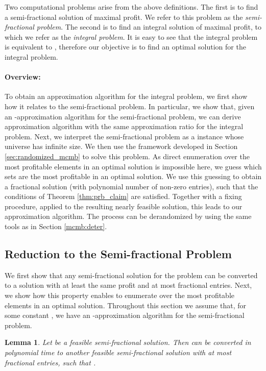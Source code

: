 \documentclass[11pt]{article}
\newtheorem{lemma}[theorem]{Lemma}
\begin{document}
{Two computational problems arise from the above definitions. The first
is to find a semi-fractional solution of maximal profit. We refer to this
problem as the {\em semi-fractional problem}. The second
is to find an integral solution of maximal profit, to which we refer as
the {\em integral problem}. It is easy to see that the integral problem is
equivalent to , therefore our objective is to find an optimal solution
for the integral problem.

\paragraph{Overview:} To obtain an approximation algorithm for the integral problem,
we first show how it relates to the semi-fractional problem. In particular, we show
that, given an -approximation algorithm for the
semi-fractional problem, we can derive approximation algorithm with
the same approximation ratio for the integral problem.
Next, we interpret the semi-fractional problem as a  instance
whose universe has infinite size.
We then use the framework developed in Section \ref{sec:randomized_mcmb}
to solve this problem. As direct enumeration over the most
profitable elements in an optimal solution is impossible here, we
guess which sets are the most profitable in an optimal solution.
We use this guessing to obtain a fractional solution (with
polynomial number of non-zero entries), such that the conditions of
Theorem \ref{thm:prb_claim} are satisfied. Together with a fixing procedure,
applied to the resulting nearly feasible solution, this leads to our
approximation algorithm. The process can be derandomized by using the
same tools as in Section \ref{mcmb:deter}.

\subsection{Reduction to the Semi-fractional Problem}

We first show that any semi-fractional solution for the problem can
be converted to a solution with at least the
same profit and at most  fractional
entries. Next, we show how this property
enables to enumerate over the most profitable elements in an optimal solution.
Throughout this section we assume that, for some constant
, we have
an -approximation algorithm for the semi-fractional problem.

\begin{lemma}
\label{lemma:frac_fix}
Let  be a feasible semi-fractional solution. Then
 can be converted in polynomial time to another feasible semi-fractional
solution  with at most  fractional entries, such
that .
\end{lemma}

}
\end{document}
